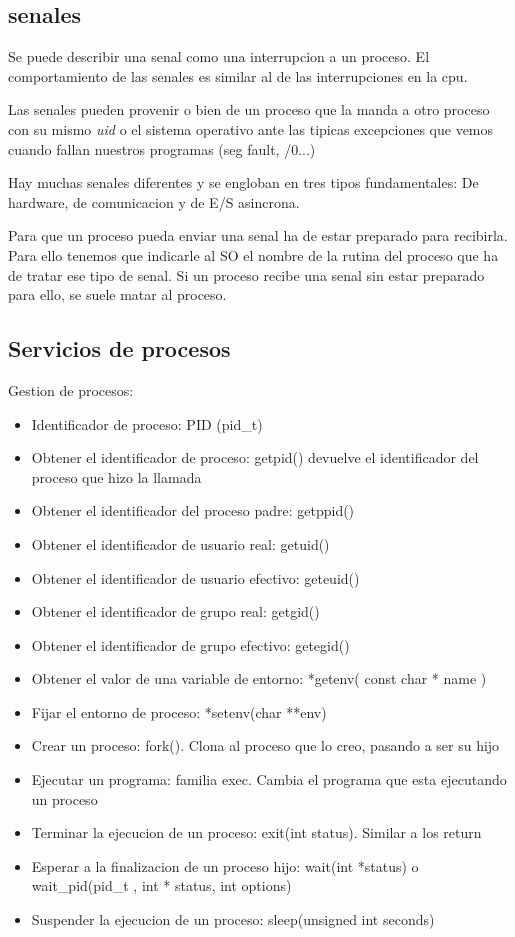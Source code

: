 \documentclass[12pt, letterpaper]{article}
\begin{document}
\subsection{senales}

Se puede describir una senal como una interrupcion a un proceso. El comportamiento de las senales es similar al de las interrupciones en la cpu.\par

Las senales pueden provenir o bien de un proceso que la manda a otro proceso con su mismo \textit{uid} o el sistema operativo ante las tipicas excepciones que vemos cuando fallan nuestros programas (seg fault, /0...)\par

Hay muchas senales diferentes y se engloban en tres tipos fundamentales: De hardware, de comunicacion y de E/S asincrona.\par

Para que un proceso pueda enviar una senal ha de estar preparado para recibirla. Para ello tenemos que indicarle al SO el nombre de la rutina del proceso que ha de tratar ese tipo de senal. Si un proceso recibe una senal sin estar preparado para ello, se suele matar al proceso.

\subsection{Servicios de procesos}

Gestion de procesos:

\begin{itemize}
	\item{Identificador de proceso: PID (pid\_t)}
	\item{Obtener el identificador de proceso: getpid() devuelve el identificador del proceso que hizo la llamada}
	\item{Obtener el identificador del proceso padre: getppid()}
	\item{Obtener el identificador de usuario real: getuid()}
	\item{Obtener el identificador de usuario efectivo: geteuid()}
	\item{Obtener el identificador de grupo real: getgid()}
	\item{Obtener el identificador de grupo efectivo: getegid()}
	\item{Obtener el valor de una variable de entorno: *getenv( const char * name )}
	\item{Fijar el entorno de proceso: *setenv(char **env)}
	\item{Crear un proceso: fork(). Clona al proceso que lo creo, pasando a ser su hijo}
	\item{Ejecutar un programa: familia exec. Cambia el programa que esta ejecutando un proceso}
	\item{Terminar la ejecucion de un proceso: exit(int status). Similar a los return}
	\item{Esperar a la finalizacion de un proceso hijo: wait(int *status) o wait\_pid(pid\_t , int * status, int options)}
	\item{Suspender la ejecucion de un proceso: sleep(unsigned int seconds)}
\end{itemize}
\end{document}
